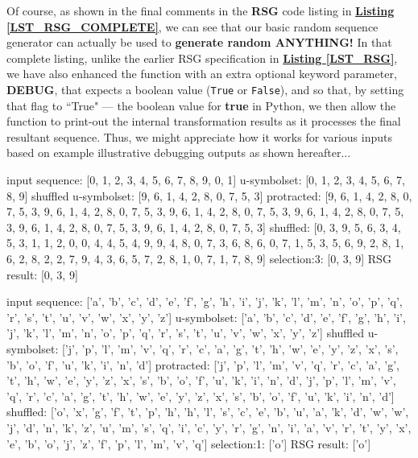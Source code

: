 \documentclass[a4paper, 18pt]{book} %
\begin{document}
Of course, as shown in the final comments in the \textbf{RSG} code listing in \textbf{\hyperref[LST_RSG_COMPLETE]{Listing \ref{LST_RSG_COMPLETE}}}, we can see that our basic random sequence generator can actually be used to \textbf{generate random ANYTHING!} In that complete listing, unlike the earlier RSG specification in \textbf{\hyperref[LST_RSG]{Listing \ref{LST_RSG}}}, we have also enhanced the function with an extra optional keyword parameter, \textbf{DEBUG}, that expects a boolean value (\texttt{True} or \texttt{False}), and so that, by setting that flag to ``True" --- the boolean value for \textbf{true} in Python, we then allow the function to print-out the internal transformation results as it processes the final resultant sequence. Thus, we might appreciate how it works for various inputs based on example illustrative debugging outputs as shown hereafter...


\vspace{1em}
  \begin{tcbverbatim}[title=Example 1: DEBUG Output of RSG: Generating a random digit 3-gram]
input sequence: [0, 1, 2, 3, 4, 5, 6, 7, 8, 9, 0, 1]
u-symbolset: [0, 1, 2, 3, 4, 5, 6, 7, 8, 9]
shuffled u-symbolset: [9, 6, 1, 4, 2, 8, 0, 7, 5, 3]
protracted: [9, 6, 1, 4, 2, 8, 0, 7, 5, 3, 9, 6, 1, 4, 2, 8, 0, 7, 5, 3, 9, 6, 1, 4, 2, 8, 0, 7, 5, 3, 9, 6, 1, 4, 2, 8, 0, 7, 5, 3, 9, 6, 1, 4, 2, 8, 0, 7, 5, 3, 9, 6, 1, 4, 2, 8, 0, 7, 5, 3]
shuffled: [0, 3, 9, 5, 6, 3, 4, 5, 3, 1, 1, 2, 0, 0, 4, 4, 5, 4, 9, 9, 4, 8, 0, 7, 3, 6, 8, 6, 0, 7, 1, 5, 3, 5, 6, 9, 2, 8, 1, 6, 2, 8, 2, 2, 7, 9, 4, 3, 6, 5, 7, 2, 8, 1, 0, 7, 1, 7, 8, 9]
selection:3: [0, 3, 9]
RSG result: [0, 3, 9]
  \end{tcbverbatim}
  \vspace{1em}
  

  \begin{tcbverbatim}[title=Example 2: DEBUG Output of RSG:: Generating a random letter]
input sequence: ['a', 'b', 'c', 'd', 'e', 'f', 'g', 'h', 'i', 'j', 'k', 'l', 'm', 'n', 'o', 'p', 'q', 'r', 's', 't', 'u', 'v', 'w', 'x', 'y', 'z']
u-symbolset: ['a', 'b', 'c', 'd', 'e', 'f', 'g', 'h', 'i', 'j', 'k', 'l', 'm', 'n', 'o', 'p', 'q', 'r', 's', 't', 'u', 'v', 'w', 'x', 'y', 'z']
shuffled u-symbolset: ['j', 'p', 'l', 'm', 'v', 'q', 'r', 'c', 'a', 'g', 't', 'h', 'w', 'e', 'y', 'z', 'x', 's', 'b', 'o', 'f', 'u', 'k', 'i', 'n', 'd']
protracted: ['j', 'p', 'l', 'm', 'v', 'q', 'r', 'c', 'a', 'g', 't', 'h', 'w', 'e', 'y', 'z', 'x', 's', 'b', 'o', 'f', 'u', 'k', 'i', 'n', 'd', 'j', 'p', 'l', 'm', 'v', 'q', 'r', 'c', 'a', 'g', 't', 'h', 'w', 'e', 'y', 'z', 'x', 's', 'b', 'o', 'f', 'u', 'k', 'i', 'n', 'd']
shuffled: ['o', 'x', 'g', 'f', 't', 'p', 'h', 'h', 'l', 's', 'c', 'e', 'b', 'u', 'a', 'k', 'd', 'w', 'w', 'j', 'd', 'n', 'k', 'z', 'u', 'm', 's', 'q', 'i', 'c', 'y', 'r', 'g', 'n', 'i', 'a', 'v', 'r', 't', 'y', 'x', 'e', 'b', 'o', 'j', 'z', 'f', 'p', 'l', 'm', 'v', 'q']
selection:1: ['o']
RSG result: ['o']
  \end{tcbverbatim}
  \vspace{1em}
  
\end{document}
